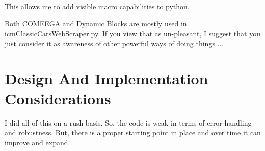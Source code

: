 \documentclass{article}
\begin{document}
This allows me to add visible macro capabilities to python.

Both COMEEGA and Dynamic Blocks are mostly used in
icmClassicCarsWebScraper.py. If you view that as un-pleasant, I
suggest that you just consider it as awareness of other powerful ways
of doing things ...


\section{Design And Implementation Considerations}

I did all of this on a rush basis. So, the code is weak in terms of error handling and robustness.
But, there is a proper starting point in place and over time it can improve and expand.




\begin{comment}
*  [[elisp:(org-cycle)][| ]]  *DBLK: main-end*                                       :: [[elisp:(beginning-of-buffer)][Top]] [[elisp:(delete-other-windows)][(1)]]  [[elisp:(org-cycle)][| ]]
\end{comment}
\end{document}
